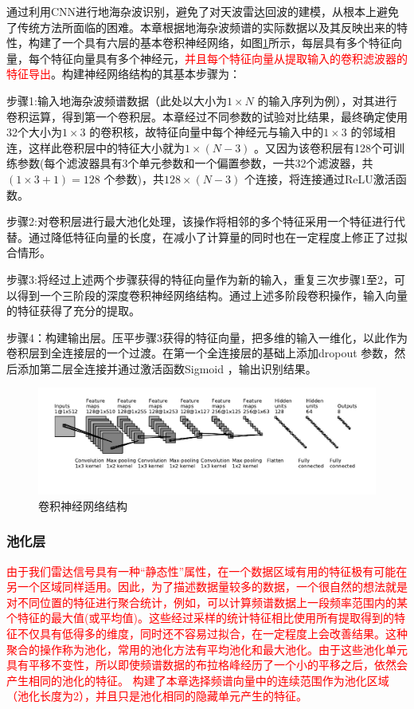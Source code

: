 通过利用CNN进行地海杂波识别，避免了对天波雷达回波的建模，从根本上避免了传统方法所面临的困难。本章根据地海杂波频谱的实际数据以及其反映出来的特性，构建了一个具有六层的基本卷积神经网络，如图\ref{fig:struct}所示，每层具有多个特征向量，每个特征向量具有多个神经元，\textcolor{red}{并且每个特征向量从提取输入的卷积滤波器的特征导出}。构建神经网络结构的其基本步骤为：

步骤1:输入地海杂波频谱数据（此处以大小为$1\times N$ 的输入序列为例），对其进行卷积运算，得到第一个卷积层。本章经过不同参数的试验对比结果，最终确定使用32个大小为$1\times 3$ 的卷积核，故特征向量中每个神经元与输入中的$1\times 3$ 的邻域相连，这样此卷积层中的特征大小就为$1\times (N-3)$ 。又因为该卷积层有128个可训练参数(每个滤波器具有3个单元参数和一个偏置参数，一共32个滤波器，共$(1\times 3 + 1) = 128$ 个参数)，共$128\times(N-3)$ 个连接，将连接通过ReLU激活函数。

步骤2:对卷积层进行最大池化处理，该操作将相邻的多个特征采用一个特征进行代替。通过降低特征向量的长度，在减小了计算量的同时也在一定程度上修正了过拟合情形。

步骤3:将经过上述两个步骤获得的特征向量作为新的输入，重复三次步骤1至2，可以得到一个三阶段的深度卷积神经网络结构。通过上述多阶段卷积操作，输入向量的特征获得了充分的提取。

步骤4：构建输出层。压平步骤3获得的特征向量，把多维的输入一维化，以此作为卷积层到全连接层的一个过渡。在第一个全连接层的基础上添加dropout 参数，然后添加第二层全连接并通过激活函数Sigmoid ，输出识别结果。

\begin{figure}[H]
	\centering
	\includegraphics[width=\textwidth]{figures/othr/struct}
	\caption{卷积神经网络结构}
	\label{fig:struct}
\end{figure}

\subsubsection{池化层}
\textcolor{red}{由于我们雷达信号具有一种“静态性”属性，在一个数据区域有用的特征极有可能在另一个区域同样适用。因此，为了描述数据量较多的数据，一个很自然的想法就是对不同位置的特征进行聚合统计，例如，可以计算频谱数据上一段频率范围内的某个特征的最大值(或平均值)。这些经过采样的统计特征相比使用所有提取得到的特征不仅具有低得多的维度，同时还不容易过拟合，在一定程度上会改善结果。这种聚合的操作称为池化，常用的池化方法有平均池化和最大池化。由于这些池化单元具有平移不变性，所以即使频谱数据的布拉格峰经历了一个小的平移之后，依然会产生相同的池化的特征。
构建了本章选择频谱向量中的连续范围作为池化区域（池化长度为2），并且只是池化相同的隐藏单元产生的特征。
}

